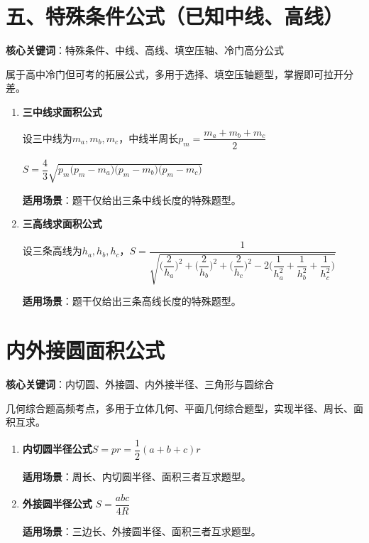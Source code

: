 \documentclass[10pt,CJKmath]{ctexart}
\begin{document}
\section*{五、特殊条件公式（已知中线、高线）}

\textbf{核心关键词}：特殊条件、中线、高线、填空压轴、冷门高分公式

属于高中冷门但可考的拓展公式，多用于选择、填空压轴题型，掌握即可拉开分差。
\begin{enumerate}[resume]
		\item \textbf{ 三中线求面积公式}

设三中线为$m_a,m_b,m_c$，中线半周长$p_m=\dfrac{m_a+m_b+m_c}{2}$

\colorbox{yellow!10}{$S=\dfrac{4}{3}\sqrt{p_m\big(p_m-m_a\big)\big(p_m-m_b\big)\big(p_m-m_c\big)}$}

\textbf{适用场景}：题干仅给出三条中线长度的特殊题型。

	\item\textbf{三高线求面积公式}

设三条高线为$h_a,h_b,h_c$，\colorbox{yellow!10}{$S=\dfrac{1}{\sqrt{\big(\dfrac{2}{h_a}\big)^2+\big(\dfrac{2}{h_b}\big)^2+\big(\dfrac{2}{h_c}\big)^2-2\big(\dfrac{1}{h_a^2}+\dfrac{1}{h_b^2}+\dfrac{1}{h_c^2}\big)}}$}

\textbf{适用场景}：题干仅给出三条高线长度的特殊题型。

\end{enumerate}

\section*{内外接圆面积公式}

\textbf{核心关键词}：内切圆、外接圆、内外接半径、三角形与圆综合

几何综合题高频考点，多用于立体几何、平面几何综合题型，实现半径、周长、面积互求。
\begin{enumerate}[resume]
	\item \textbf{内切圆半径公式}\colorbox{yellow!10}{$S=pr=\dfrac{1}{2}(a+b+c)r$}

\textbf{适用场景}：周长、内切圆半径、面积三者互求题型。

	\item\textbf{外接圆半径公式} \colorbox{yellow!10}{$S=\dfrac{abc}{4R}$}

\textbf{适用场景}：三边长、外接圆半径、面积三者互求题型。

\end{enumerate}
\end{document}
